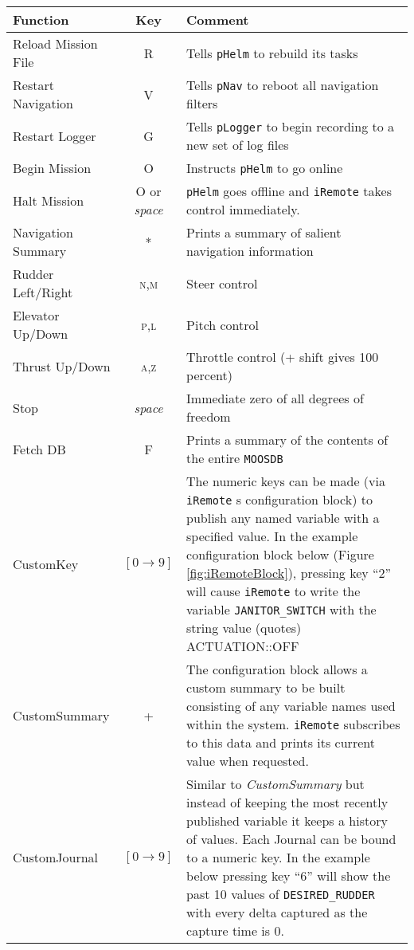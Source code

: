\documentclass[a4paper,10pt]{article}
\newcommand{\Code}[1]{\texttt{#1} }
\newcommand{\code}[1]{\Code{#1} }
\newcommand{\DB}   {\code{{MOOSDB}}}
\begin{document}
\begin{tabularx}{\linewidth}{l|c|X}
\textbf{Function} & \textbf{Key} & \textbf{Comment} \\ \hline

 Reload Mission File & \textsc{R} & Tells \code{pHelm} to
rebuild its
tasks \\
%
Restart Navigation & \textsc{V} & Tells \code{pNav} to reboot all
navigation filters
\\
%
Restart Logger  & \textsc{G} & Tells \code{pLogger} to begin
recording to a new set of log files \\
%
Begin Mission & \textsc{O} & Instructs \code{pHelm} to go online\\
%
Halt Mission & \textsc{O} or {\it{space}} & \code{pHelm} goes
offline and \code{iRemote} takes control immediately. \\
%
Navigation Summary & \textsc{*} & Prints a summary of salient
navigation information \\
%
Rudder Left/Right & \textsc{n},\textsc{m} & Steer control \\
%
Elevator Up/Down & \textsc{p},\textsc{l} & Pitch control \\
%
Thrust Up/Down & \textsc{a},\textsc{z} & Throttle control (+ shift
gives 100 percent) \\
%
Stop        & {\it{space}} & Immediate zero of all degrees of
freedom \\
%
Fetch DB       & \textsc{F} & Prints a summary of the contents of the entire \DB \\
%
CustomKey & $[0 \rightarrow 9]$ & The numeric keys can be made
(via \code{iRemote}s configuration block) to publish any named
variable with a specified value. In the example configuration
block below (Figure \ref{fig:iRemoteBlock}), pressing  key ``2''
will cause \code{iRemote} to write the variable
\code{JANITOR\_SWITCH} with the string value (quotes)
ACTUATION::OFF \\
%
CustomSummary & \textsc{+} & The configuration block allows a
custom summary to be built consisting of any variable names used
within the system. \code{iRemote} subscribes to this data and
prints its current value when requested.\\
%
{{CustomJournal}} & $[0 \rightarrow 9]$ & Similar to
{\it{CustomSummary}} but instead of keeping the most recently
published variable it keeps a history of values. Each Journal can
be  bound to a numeric key. In the example below pressing key
``6'' will show the past 10 values of \code{DESIRED\_RUDDER} with
every delta captured as the
capture time is 0.\\
\end{tabularx}
\end{document}
